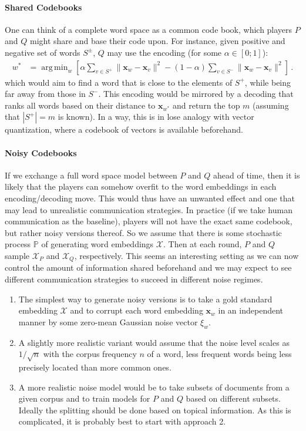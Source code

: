 \documentclass{article}
\newcommand{\x}{{\mathbf x}}
\DeclareMathOperator*{\argmin}{arg\,min}
\begin{document}
\paragraph{Shared Codebooks}  One can think of a complete word space as a common code book, which players $P$ and $Q$ might share and base their code upon. For instance, given positive and negative set of words $S^\pm$, $Q$ may use the encoding (for some $\alpha \in [0;1]$):
\begin{align}
w^* & = \argmin_{w} \left[ \alpha \sum_{v \in S^+} \| \x_w - \x_v\|^2  - (1-\alpha) \sum_{v \in S^-} \| \x_w - \x_v\|^2 \right]\,.
\end{align}
which would aim to find a word that is close to the elements of $S^+$, while being far away from those in $S^-$. This encoding would be mirrored by a decoding that ranks all words based on their distance to $\x_{w^*}$ and return the top $m$ (assuming that $|S^+|=m$ is known). In a way, this is in lose analogy with vector quantization, where a codebook of vectors is available beforehand. 

\paragraph{Noisy Codebooks} If we exchange a full word space model between $P$ and $Q$ ahead of time, then it is likely that the players can somehow overfit to the word embeddings in each encoding/decoding move. This would thus have an unwanted effect and one that may lead to unrealistic communication strategies. In practice (if we take human communication as the baseline), players will not have the exact same codebook, but rather noisy versions thereof. So we assume that there is some stochastic process $\mathbb P$ of generating word embeddings $\mathcal X$. Then at each round, $P$ and $Q$ sample $\mathcal  X_P$ and $\mathcal X_Q$, respectively. This seems an interesting setting as we can now control the amount of information shared beforehand and we may expect to see different communication strategies to succeed in different noise regimes. 

\begin{enumerate}
\item The simplest way to generate noisy versions is to take a gold standard embedding $\mathcal X$ and to corrupt each word embedding $\x_w$ in an independent manner by some zero-mean Gaussian noise vector $\xi_w$. 
\item A slightly more realistic variant would assume that the noise level scales as $1/\sqrt{n}$ with the corpus frequency $n$ of a word, less frequent words being less precisely located than more common ones. 
\item A more realistic noise model would be to take subsets of documents from a given corpus and to train models for $P$ and $Q$ based on different subsets. Ideally the splitting should be done based on topical information. As this is complicated, it is probably best to start with approach 2.
\end{enumerate}
\end{document}
